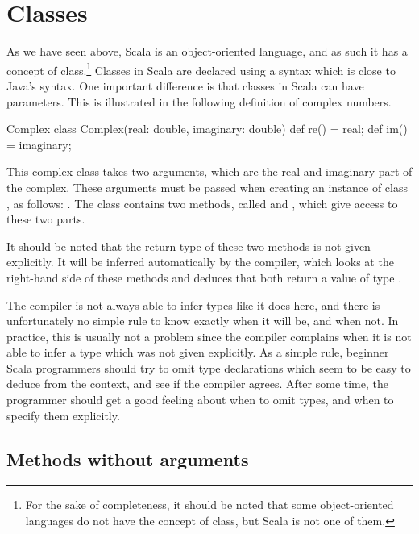 \documentclass[a4paper,12pt,twoside,titlepage]{article}
\newcommand{\langname}[1]{#1\xspace}
\newcommand{\Scala}{\langname{Scala}}
\newcommand{\Java}{\langname{Java}}
\begin{document}

\section{Classes}
\label{sec:classes}

As we have seen above, \Scala is an object-oriented language, and as
such it has a concept of class.\footnote{For the sake of completeness,
  it should be noted that some object-oriented languages do not have
  the concept of class, but \Scala is not one of them.}
Classes in \Scala are declared using a syntax which is close to
\Java's syntax. One important difference is that classes in \Scala can
have parameters. This is illustrated in the following definition of
complex numbers.
\begin{scalaprogram}{Complex}
class Complex(real: double, imaginary: double) {
  def re() = real;
  def im() = imaginary;
}
\end{scalaprogram}
This complex class takes two arguments, which are the real and
imaginary part of the complex. These arguments must be passed when
creating an instance of class , as follows: . The class contains two methods, called 
and , which give access to these two parts.

It should be noted that the return type of these two methods is not
given explicitly. It will be inferred automatically by the compiler,
which looks at the right-hand side of these methods and deduces that
both return a value of type .

The compiler is not always able to infer types like it does here, and
there is unfortunately no simple rule to know exactly when it will be,
and when not. In practice, this is usually not a problem since the
compiler complains when it is not able to infer a type which was not
given explicitly. As a simple rule, beginner \Scala programmers should
try to omit type declarations which seem to be easy to deduce from the
context, and see if the compiler agrees. After some time, the
programmer should get a good feeling about when to omit types, and
when to specify them explicitly.

\subsection{Methods without arguments}
\label{sec:meth-wo-args}
\end{document}

